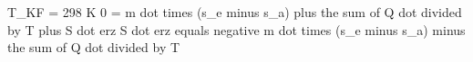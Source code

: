 T_KF = 298 K  
0 = m dot times (s_e minus s_a) plus the sum of Q dot divided by T plus S dot erz  
S dot erz equals negative m dot times (s_e minus s_a) minus the sum of Q dot divided by T
